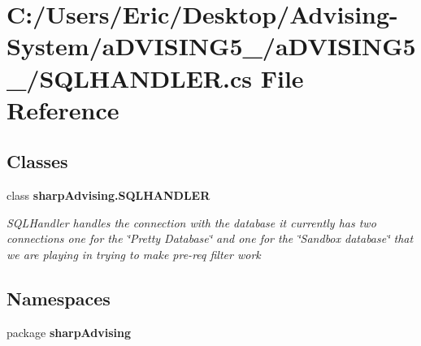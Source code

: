 \section{C\+:/\+Users/\+Eric/\+Desktop/\+Advising-\/\+System/a\+D\+V\+I\+S\+I\+N\+G5\+\_/a\+D\+V\+I\+S\+I\+N\+G5\+\_/\+S\+Q\+L\+H\+A\+N\+D\+L\+E\+R.cs File Reference}
\label{_s_q_l_h_a_n_d_l_e_r_8cs}
\subsection*{Classes}
\begin{DoxyCompactItemize}
\item 
class {\bfseries sharp\+Advising.\+S\+Q\+L\+H\+A\+N\+D\+L\+E\+R}
\begin{DoxyCompactList}\small\item\em S\+Q\+L\+Handler handles the connection with the database it currently has two connections one for the \char`\"{}\+Pretty Database\char`\"{} and one for the \char`\"{}\+Sandbox database\char`\"{} that we are playing in trying to make pre-\/req filter work \end{DoxyCompactList}\end{DoxyCompactItemize}
\subsection*{Namespaces}
\begin{DoxyCompactItemize}
\item 
package {\bf sharp\+Advising}
\end{DoxyCompactItemize}
